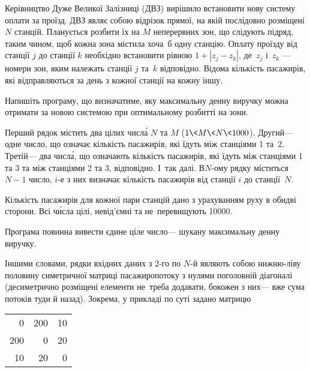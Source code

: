 

 
Керівництво Дуже Великої Залізниці (ДВЗ) вирішило встановити нову систему оплати за проїзд. 
ДВЗ являє собою відрізок прямої, на якій послідовно розміщені $N$ станцій. 
Планується розбити їх на $M$ неперервних зон, що слідують підряд, таким чином, 
щоб кожна зона містила хоча~б одну станцію. 
Оплату проїзду від станції $j$ до станції $k$ необхідно встановити рівною 
${1{+}|z_j{-}z_k|}$, де~$z_j$ і~$z_k$ ---
номери зон, яким належать станції $j$ та~$k$ відповідно.
Відома кількість пасажирів, які відправляються за день з кожної станції на кожну іншу.


Напишіть програму, що визначатиме, яку максимальну денну виручку можна отримати 
за новою системою при оптимальному розбитті на зони.

\InputFile

Перший рядок містить два цілих числ\'{а} $N$ та $M$ (${1{\<}M{\<}N{\<}1000}$).
Другий\nolinebreak[3] --- одне число, що означає кількість пасажирів, 
які їдуть між станціями 1 та~2.
Третій\nolinebreak[3] --- два числ\'{а}, що означають кількість пасажирів, 
які їдуть між станціями 1 та 3 та між станціями 2 та 3, 
відповідно.
І~так далі. В\nolinebreak[3] \mbox{$N$-ому} рядку міститься $N{-}1$ число, 
\mbox{$i$-е} з них визначає кількість пасажирів від станції $i$ до станції~$N$. 

Кількість пасажирів для кожної пари станцій дано 
з урахуванням руху в обидві сторони. 
Всі ч\'{и}сла цілі, невід’ємні та не~перевищують 10000.

\OutputFile
Програма повинна вивести єдине ціле число\nolinebreak[3] --- шукану максимальну денну виручку.

\Example

\begin{example}
%
\end{example}
 
\Notes
Іншими словами, рядки вхідних даних з 2-го по $N$-й 
являють собою нижню-ліву половину 
симетричної матриці пасажиропотоку з нулями по\nolinebreak[2] головній діагоналі
(де\nolinebreak[3] симетрично розміщені елементи не~треба додавати, бо\nolinebreak[3] кожен з них\nolinebreak[3] --- вже сума потоків туди й назад).
Зокрема, у прикладі по суті задано матрицю 
\begin{scriptsize}
\begin{tabular}{rrr}
        0
       & 
        200
       & 
        10
       \\ 
        200
       & 
        0
       & 
        20
       \\ 
        10
       & 
        20
       & 
        0
\end{tabular}
\end{scriptsize}

